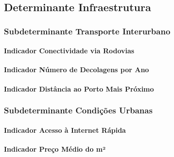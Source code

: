 \documentclass[
  12,
  dvipsnames]{article}
\begin{document}
\hypertarget{determinante-infraestrutura}{%
\subsection{Determinante
Infraestrutura}\label{determinante-infraestrutura}}

\hypertarget{subdeterminante-transporte-interurbano}{%
\subsubsection{Subdeterminante Transporte
Interurbano}\label{subdeterminante-transporte-interurbano}}

\hypertarget{indicador-conectividade-via-rodovias}{%
\paragraph{Indicador Conectividade via
Rodovias}\label{indicador-conectividade-via-rodovias}}

\hypertarget{indicador-nuxfamero-de-decolagens-por-ano}{%
\paragraph{Indicador Número de Decolagens por
Ano}\label{indicador-nuxfamero-de-decolagens-por-ano}}

\hypertarget{indicador-distuxe2ncia-ao-porto-mais-pruxf3ximo}{%
\paragraph{Indicador Distância ao Porto Mais
Próximo}\label{indicador-distuxe2ncia-ao-porto-mais-pruxf3ximo}}

\hypertarget{subdeterminante-condiuxe7uxf5es-urbanas}{%
\subsubsection{Subdeterminante Condições
Urbanas}\label{subdeterminante-condiuxe7uxf5es-urbanas}}

\hypertarget{indicador-acesso-uxe0-internet-ruxe1pida}{%
\paragraph{Indicador Acesso à Internet
Rápida}\label{indicador-acesso-uxe0-internet-ruxe1pida}}

\hypertarget{indicador-preuxe7o-muxe9dio-do-muxb2}{%
\paragraph{Indicador Preço Médio do
m²}\label{indicador-preuxe7o-muxe9dio-do-muxb2}}
\end{document}

